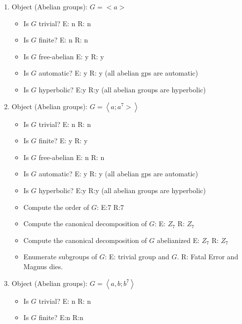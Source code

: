 \documentclass{article}
\begin{document}
\begin{enumerate}

\item Object (Abelian groups): $G=<a>$
\begin{itemize}

\item Is $G$ trivial? E: n  R: n

\item Is $G$ finite? E: n R: n

\item Is $G$ free-abelian E: y R: y

\item Is $G$ automatic? E: y R: y (all abelian gps are automatic)

\item Is $G$ hyperbolic? E:y R:y (all abelian groups are hyperbolic) 
\end{itemize}
\item Object (Abelian groups): $G=\left<a;a^7>\right>$
\begin{itemize}

\item Is $G$ trivial? E: n R: n

\item Is $G$ finite? E: y R: y

\item Is $G$ free-abelian E: n R: n

\item Is $G$ automatic? E: y R: y (all abelian gps are automatic)

\item Is $G$ hyperbolic? E:y R:y (all abelian groups are hyperbolic)
\item Compute the order of $G$: E:7 R:7
\item Compute the canonical decomposition of $G$:
E: $Z_7$ R: $Z_7$
\item Compute the canonical decomposition of $G$ abelianized
E: $Z_7$ R: $Z_7$
\item Enumerate subgroups of $G$:
E: trivial group and $G$. 
R: Fatal Error and Magnus dies.
\end{itemize}
\item Object (Abelian groups): $G=\left<a,b; b^7 \right>$ 
\begin{itemize}

\item Is $G$ trivial? E: n R: n

\item Is $G$ finite? E:n R:n 


\end{itemize}
\end{enumerate}
\end{document}
